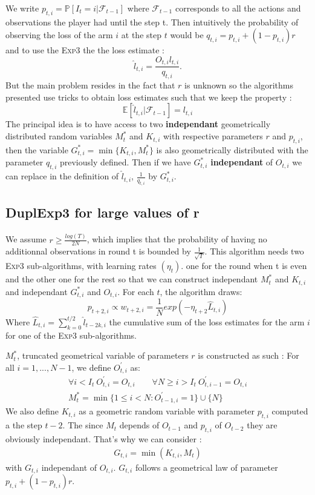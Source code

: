 \documentclass[11pt,a4paper]{article}
\begin{document}
We write $p_{t,i}=\mathbb{P}[I_t=i|\mathcal{F}_{t-1}]$ where $\mathcal{F}_{t-1}$ corresponds to all the actions and observations the player had until the step t. Then intuitively the probability of observing the loss of the arm $i$ at the step $t$ would be $q_{t,i}=p_{t,i} + (1-p_{t,i})r$ and to use the \textsc{Exp}$3$
the the loss estimate :
\[
\hat{l}_{t,i}=\frac{O_{t,i}l_{t,i}}{q_{t,i}}.
\]
But the main problem resides in the fact that $r$ is unknown so the algorithms presented use tricks to obtain loss estimates such that we keep the property :
\[
\mathbb{E}[\hat{l}_{t,i}|\mathcal{F}_{t-1}]=l_{t,i}
\]
The principal idea is to have access to two \textbf{independant} geometrically distributed random variables $M_t^*$ and $K_{t,i}$ with respective parameters $r$ and $p_{t,i}$, then the variable $G_{t,i}^*=\min\{K_{t,i},M_t^*\}$ is also geometrically distributed with the parameter $q_{t,i}$ previously defined. Then if we have $G_{t,i}^*$ \textbf{independant} of $O_{t,i}$ we can replace in the definition of $\hat{l}_{t,i}$, $\frac{1}{q_{t,i}}$ by $G_{t,i}^*$.

\subsection{DuplExp3 for large values of r}
\paragraph{}We assume $ r\geq \frac{log(T)}{2N}$, which implies that the probability of having no additionnal observations in round t is bounded by $\frac{1}{\sqrt{T}}$.\newline
This algorithm needs two \textsc{Exp3} sub-algorithms, with learning rates $\left(\eta_t\right)$. one for the round when t is even and the other one for the rest so that we can construct independant $M_t^*$ and $K_{t,i}$ and independant $G_{t,i}^*$ and $O_{t,i}$.
For each $t$, the algorithm draws:
\[
p_{t+2,i}\propto w_{t+2,i}= \frac{1}{N} exp\left( -\eta_{t+2} \hat{L}_{t,i} \right)
\]
Where $\hat{L}_{t,i}=\sum_{k=0}^{t/2} \hat{l}_{t-2k,i}$ the cumulative sum of the loss estimates for the arm $i$ for one of the \textsc{Exp3} sub-algorithms.

$M_t^*$, truncated geometrical variable of parameters $r$ is constructed as such : 
For all $i=1,...,N-1$, we define $O_{t,i}^{'}$ as:
\begin{align*}
\forall i<I_{t}\ O_{t,i}^{'}=O_{t,i} \qquad \forall N\geq i>I_{t}\ O_{t,i-1}^{'}=O_{t,i} \\
M_t^* =\min\{1\leq i<N: O_{t-1,i}^{'} =1\}\cup\{N\}
\end{align*}
We also define $K_{t,i}$ as a geometric random variable with parameter $p_{t,i}$ computed a the step $t-2$. The since $M_t$ depends of $O_{t-1}$ and $p_{t,i}$ of $O_{t-2}$ they are obviously independant. That's why we can consider :
\begin{align*}
	G_{t,i}=\min\left(K_{t,i},M_t\right)
\end{align*}
with $G_{t,i}$ independant of $O_{t,i}$. $G_{t,i}$ follows a geometrical law of parameter $p_{t,i}+(1-p_{t,i})r$.
\end{document}
